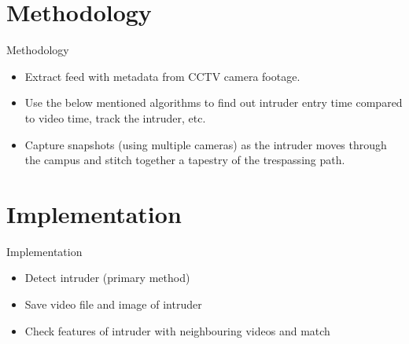 \documentclass{beamer}
\begin{document}

\section{Methodology} 
\begin{frame}{Methodology}
  \begin{itemize}
   
    \item Extract feed with metadata from CCTV camera footage.
    \newline
    \item Use the below mentioned algorithms to find out intruder entry time compared to video time, track the intruder, etc. 
    \newline
    \item Capture snapshots (using multiple cameras) as the intruder moves through the campus and stitch together a tapestry of the trespassing path.
    \newline

  \end{itemize}
\end{frame}


\section{Implementation} 
\begin{frame}{Implementation}
  \begin{itemize}
   
    \item Detect intruder (primary method)
    \newline
    \item Save video file and image of intruder
    \newline
    \item Check features of intruder with neighbouring videos and match
    \newline

  \end{itemize}
\end{frame}

\end{document}
